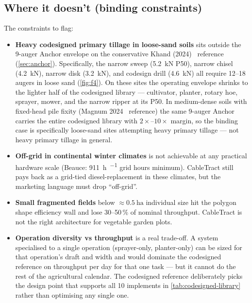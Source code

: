 \documentclass[11pt,a4paper]{article}
\begin{document}
\subsection{Where it doesn't (binding constraints)}\label{sec:loses}

The constraints to flag:

\begin{itemize}[leftmargin=1.6em,itemsep=0.15em]
    \item \textbf{Heavy codesigned primary tillage in loose-sand soils} sits outside the 9-auger Anchor envelope on the conservative Khand (2024)~\cite{khand2024helical} reference (\cref{sec:anchor}). Specifically, the narrow sweep (\SI{5.2}{\kilo\newton} P50), narrow chisel (\SI{4.2}{\kilo\newton}), narrow disk (\SI{3.2}{\kilo\newton}), and codesign drill (\SI{4.6}{\kilo\newton}) all require 12--18 augers in loose sand (\cref{fig:f4}). On these sites the operating envelope shrinks to the lighter half of the codesigned library --- cultivator, planter, rotary hoe, sprayer, mower, and the narrow ripper at its P50. In medium-dense soils with fixed-head pile fixity (Magnum 2024~\cite{magnum2024fixed} reference) the same 9-auger Anchor carries the entire codesigned library with $2\times$--$10\times$ margin, so the binding case is specifically loose-sand sites attempting heavy primary tillage --- not heavy primary tillage in general.
    \item \textbf{Off-grid in continental winter climates} is not achievable at any practical hardware scale (Beauce: \SI{911}{\hour\per\year} grid hours minimum). CableTract still pays back as a grid-tied diesel-replacement in these climates, but the marketing language must drop ``off-grid''.
    \item \textbf{Small fragmented fields} below ${\approx}\SI{0.5}{\hectare}$ individual size hit the polygon shape efficiency wall and lose 30--50\,\% of nominal throughput. CableTract is not the right architecture for vegetable garden plots.
    \item \textbf{Operation diversity vs throughput} is a real trade-off. A system specialised to a single operation (sprayer-only, planter-only) can be sized for that operation's draft and width and would dominate the codesigned reference on throughput per day for that one task --- but it cannot do the rest of the agricultural calendar. The codesigned reference deliberately picks the design point that supports all 10 implements in \cref{tab:codesigned-library} rather than optimising any single one.
\end{itemize}
\end{document}
